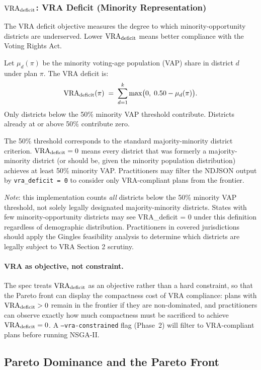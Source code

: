 \subsubsection{$\mathrm{VRA}_{\mathrm{deficit}}$: VRA Deficit (Minority Representation)}

The VRA deficit objective measures the degree to which minority-opportunity
districts are underserved.
Lower $\mathrm{VRA}_{\mathrm{deficit}}$ means better compliance with the Voting Rights Act.

\begin{definition}
\label{def:vra}
Let $\mu_d(\pi)$ be the minority voting-age population (VAP) share in district
$d$ under plan $\pi$.
The VRA deficit is:
\[
  \mathrm{VRA}_{\mathrm{deficit}}(\pi) \;=\; \sum_{d=1}^{k} \max\bigl(0,\; 0.50 - \mu_d(\pi)\bigr).
\]
Only districts below the 50\% minority VAP threshold contribute.
Districts already at or above 50\% contribute zero.
\end{definition}

The 50\% threshold corresponds to the standard majority-minority district
criterion.
$\mathrm{VRA}_{\mathrm{deficit}} = 0$ means every district that was formerly a majority-minority district
(or should be, given the minority population distribution) achieves at least
50\% minority VAP.
Practitioners may filter the NDJSON output by \texttt{vra\_deficit = 0} to
consider only VRA-compliant plans from the frontier.

\textit{Note}: this implementation counts \emph{all} districts below the 50\% minority VAP threshold, not solely legally designated majority-minority districts. States with few minority-opportunity districts may see VRA\_deficit = 0 under this definition regardless of demographic distribution. Practitioners in covered jurisdictions should apply the Gingles feasibility analysis to determine which districts are legally subject to VRA Section 2 scrutiny.

\paragraph{VRA as objective, not constraint.}
The spec treats $\mathrm{VRA}_{\mathrm{deficit}}$ as an objective rather than a hard constraint, so
that the Pareto front can display the compactness cost of VRA compliance:
plans with $\mathrm{VRA}_{\mathrm{deficit}} > 0$ remain in the frontier if they are non-dominated, and
practitioners can observe exactly how much compactness must be sacrificed to
achieve $\mathrm{VRA}_{\mathrm{deficit}} = 0$.
A \texttt{--vra-constrained} flag (Phase~2) will filter to VRA-compliant plans
before running NSGA-II.

\subsection{Pareto Dominance and the Pareto Front}

